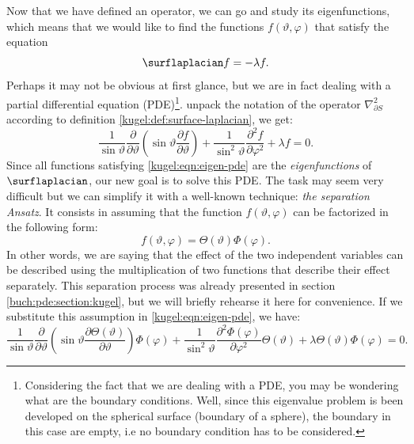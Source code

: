 Now that we have defined an operator, we can go and study its eigenfunctions,
which means that we would like to find the functions $f(\vartheta, \varphi)$
that satisfy the equation
\begin{equation} \label{kugel:eqn:eigen}
    \surflaplacian f = -\lambda f.
\end{equation}
Perhaps it may not be obvious at first glance, but we are in fact dealing with a
partial differential equation (PDE)\footnote{
  Considering the fact that we are dealing with a PDE, 
  you may be wondering what are the boundary conditions. Well, since this eigenvalue problem is been developed on 
  the spherical surface (boundary of a sphere), the boundary in this case are empty, i.e no boundary condition has to be considered.}.
unpack the notation of the operator $\nabla^2_{\partial S}$ according to
definition
\ref{kugel:def:surface-laplacian}, we get:
\begin{equation} \label{kugel:eqn:eigen-pde}
    \frac{1}{\sin\vartheta} \frac{\partial}{\partial \vartheta} \left(
      \sin\vartheta \frac{\partial f}{\partial\vartheta}
    \right)
    + \frac{1}{\sin^2 \vartheta} \frac{\partial^2 f}{\partial\varphi^2}
    + \lambda f = 0.
\end{equation}
Since all functions satisfying \eqref{kugel:eqn:eigen-pde} are the
\emph{eigenfunctions} of $\surflaplacian$, our new goal is to solve this PDE.
The task may seem very difficult but we can simplify it with a well-known
technique: \emph{the separation Ansatz}. It consists in assuming that the
function $f(\vartheta, \varphi)$ can be factorized in the following form:
\begin{equation}
    f(\vartheta, \varphi) = \Theta(\vartheta)\Phi(\varphi). 
\end{equation}
In other words, we are saying that the effect of the two independent variables
can be described using the multiplication of two functions that describe their
effect separately. This separation process was already presented in section
\ref{buch:pde:section:kugel}, but we will briefly rehearse it here for
convenience. If we substitute this assumption in
\eqref{kugel:eqn:eigen-pde}, we have:
\begin{equation*}
    \frac{1}{\sin\vartheta} \frac{\partial}{\partial \vartheta} \left(
      \sin\vartheta \frac{\partial  \Theta(\vartheta)}{\partial\vartheta}
    \right) \Phi(\varphi)
    + \frac{1}{\sin^2 \vartheta}
      \frac{\partial^2 \Phi(\varphi)}{\partial\varphi^2}
      \Theta(\vartheta)
    + \lambda \Theta(\vartheta)\Phi(\varphi) = 0.
\end{equation*}
